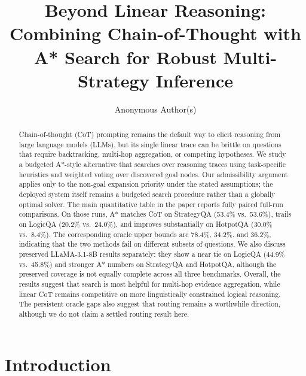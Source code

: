 \documentclass[11pt]{article}
\title{Beyond Linear Reasoning: Combining Chain-of-Thought with A* Search for Robust Multi-Strategy Inference}
\author{
  Anonymous Author(s)
}
\begin{document}
\maketitle

\begin{abstract}
Chain-of-thought (CoT) prompting remains the default way to elicit reasoning from large language models (LLMs), but its single linear trace can be brittle on questions that require backtracking, multi-hop aggregation, or competing hypotheses. We study a budgeted A*-style alternative that searches over reasoning traces using task-specific heuristics and weighted voting over discovered goal nodes. Our admissibility argument applies only to the non-goal expansion priority under the stated assumptions; the deployed system itself remains a budgeted search procedure rather than a globally optimal solver. The main quantitative table in the paper reports fully paired full-run comparisons. On those runs, A* matches CoT on StrategyQA (53.4\% vs.\ 53.6\%), trails on LogicQA (20.2\% vs.\ 24.0\%), and improves substantially on HotpotQA (30.0\% vs.\ 8.4\%). The corresponding oracle upper bounds are 78.4\%, 34.2\%, and 36.2\%, indicating that the two methods fail on different subsets of questions. We also discuss preserved LLaMA-3.1-8B results separately: they show a near tie on LogicQA (44.9\% vs.\ 45.8\%) and stronger A* numbers on StrategyQA and HotpotQA, although the preserved coverage is not equally complete across all three benchmarks. Overall, the results suggest that search is most helpful for multi-hop evidence aggregation, while linear CoT remains competitive on more linguistically constrained logical reasoning. The persistent oracle gaps also suggest that routing remains a worthwhile direction, although we do not claim a settled routing result here.
\end{abstract}

\section{Introduction}
\label{sec:intro}

\end{document}

